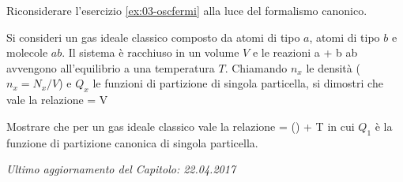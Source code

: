 \begin{Exercise}[title={Oscillatori di Fermi, la vendetta canonica},
label={ex:04-oscfermi}]
Riconsiderare l'esercizio \ref{ex:03-oscfermi} alla luce del formalismo canonico.
\end{Exercise}

\begin{Exercise}[title={Equilibrio chimico},label={ex:04-eqchim}]
Si consideri un gas ideale classico composto da atomi di tipo $a$, atomi di tipo $b$ e molecole $ab$. Il sistema è racchiuso in un volume $V$ e le reazioni
\be
a + b \rightleftharpoons ab
\ee
avvengono all'equilibrio a una temperatura $T$. Chiamando $n_x$ le densità ($n_x = N_x/V$) e $Q_x$ le funzioni di partizione di singola particella, si dimostri che vale la relazione
\be
{} = V
\ee
\end{Exercise}

\begin{Exercise}[title={Entropia di un gas ideale classico},label={ex:04-esps}]
Mostrare che per un gas ideale classico vale la relazione
\be
{} = \ln\left(\right) + T
\ee
in cui $Q_1$ è la funzione di partizione canonica di singola particella.
\end{Exercise}


\vskip 0.75cm
\begin{flushright}
{\em Ultimo aggiornamento del Capitolo: 22.04.2017}
\end{flushright}

